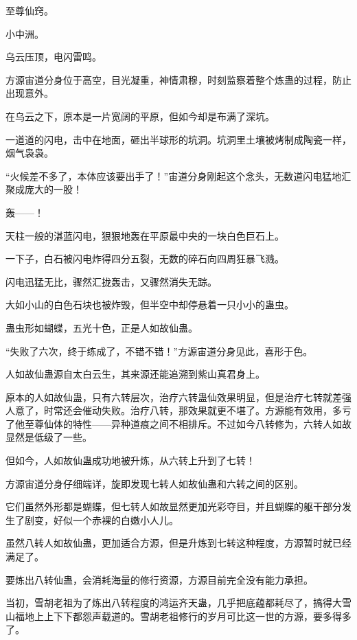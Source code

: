 
\begin{this_body}



至尊仙窍。

小中洲。

乌云压顶，电闪雷鸣。

方源宙道分身位于高空，目光凝重，神情肃穆，时刻监察着整个炼蛊的过程，防止出现意外。

在乌云之下，原本是一片宽阔的平原，但如今却是布满了深坑。

一道道的闪电，击中在地面，砸出半球形的坑洞。坑洞里土壤被烤制成陶瓷一样，烟气袅袅。

“火候差不多了，本体应该要出手了！”宙道分身刚起这个念头，无数道闪电猛地汇聚成庞大的一股！

轰——！

天柱一般的湛蓝闪电，狠狠地轰在平原最中央的一块白色巨石上。

一下子，白石被闪电炸得四分五裂，无数的碎石向四周狂暴飞溅。

闪电迅猛无比，骤然汇拢轰击，又骤然消失无踪。

大如小山的白色石块也被炸毁，但半空中却停悬着一只小小的蛊虫。

蛊虫形如蝴蝶，五光十色，正是人如故仙蛊。

“失败了六次，终于练成了，不错不错！”方源宙道分身见此，喜形于色。

人如故仙蛊源自太白云生，其来源还能追溯到紫山真君身上。

原本的人如故仙蛊，只有六转层次，治疗六转蛊仙效果明显，但是治疗七转就差强人意了，时常还会催动失败。治疗八转，那效果就更不堪了。方源能有效用，多亏了他至尊仙体的特性——异种道痕之间不相排斥。不过如今八转修为，六转人如故显然是低级了一些。

但如今，人如故仙蛊成功地被升炼，从六转上升到了七转！

方源宙道分身仔细端详，旋即发现七转人如故仙蛊和六转之间的区别。

它们虽然外形都是蝴蝶，但七转人如故显然更加光彩夺目，并且蝴蝶的躯干部分发生了剧变，好似一个赤裸的白嫩小人儿。

虽然八转人如故仙蛊，更加适合方源，但是升炼到七转这种程度，方源暂时就已经满足了。

要炼出八转仙蛊，会消耗海量的修行资源，方源目前完全没有能力承担。

当初，雪胡老祖为了炼出八转程度的鸿运齐天蛊，几乎把底蕴都耗尽了，搞得大雪山福地上上下下都怨声载道的。雪胡老祖修行的岁月可比这一世的方源，要多得多了。


\end{this_body}

